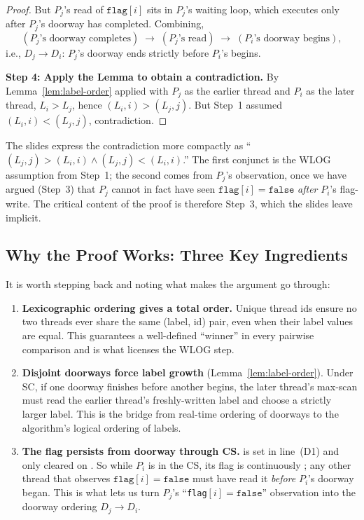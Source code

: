 \begin{proof}
But $P_j$'s read of $\texttt{flag}[i]$ sits in $P_j$'s waiting loop, which
executes only after $P_j$'s doorway has completed. Combining,
\[
  (\text{$P_j$'s doorway completes}) \;\to\; (\text{$P_j$'s read})
  \;\to\; (\text{$P_i$'s doorway begins}),
\]
i.e., $D_j \to D_i$: $P_j$'s doorway ends strictly before $P_i$'s begins.

\medskip
\noindent\textbf{Step 4: Apply the Lemma to obtain a contradiction.}
By Lemma~\ref{lem:label-order} applied with $P_j$ as the earlier thread and
$P_i$ as the later thread, $L_i > L_j$, hence $(L_i, i) > (L_j, j)$. But
Step~1 assumed $(L_i, i) < (L_j, j)$, contradiction.
\end{proof}

\begin{ppnote}
\par
The slides express the contradiction more compactly as
``$(L_j, j) > (L_i, i) \wedge (L_j, j) < (L_i, i)$.'' The first conjunct is
the WLOG assumption from Step~1; the second comes from $P_j$'s observation,
once we have argued (Step~3) that $P_j$ cannot in fact have seen
$\texttt{flag}[i] = \texttt{false}$ \emph{after} $P_i$'s flag-write. The
critical content of the proof is therefore Step~3, which the slides leave
implicit.
\end{ppnote}

\subsection{Why the Proof Works: Three Key Ingredients}

It is worth stepping back and noting what makes the argument go through:

\begin{enumerate}[nosep]
  \item \textbf{Lexicographic ordering gives a total order.} Unique thread ids
        ensure no two threads ever share the same (label, id) pair, even when
        their label values are equal. This guarantees a well-defined ``winner''
        in every pairwise comparison and is what licenses the WLOG step.
  \item \textbf{Disjoint doorways force label growth}
        (Lemma~\ref{lem:label-order}). Under SC, if one doorway finishes
        before another begins, the later thread's max-scan must read the
        earlier thread's freshly-written label and choose a strictly larger
        label. This is the bridge from real-time ordering of doorways to the
        algorithm's logical ordering of labels.
  \item \textbf{The flag persists from doorway through CS.}
         is set in line~(D1) and only cleared on
        . So while $P_i$ is in the CS, its flag is
        continuously ; any other thread that observes
        $\texttt{flag}[i] = \texttt{false}$ must have read it \emph{before}
        $P_i$'s doorway began. This is what lets us turn $P_j$'s
        ``\texttt{flag}$[i] = \texttt{false}$'' observation into the
        doorway ordering $D_j \to D_i$.
\end{enumerate}

